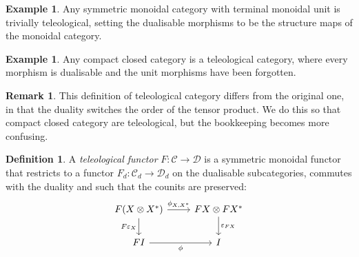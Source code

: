 \documentclass[11pt,letterpaper]{article}
\theoremstyle{plain}
\theoremstyle{definition}
\newtheorem{definition}[theorem]{Definition}
\newtheorem{example}[theorem]{Example}
\newtheorem{remark}[theorem]{Remark}
\newcommand{\C}{\mathscr{C}}
\newcommand{\D}{\mathscr{D}}
\newcommand{\todo}[1]{\textcolor{red}{\small #1}}
\begin{document}
\begin{example}
  Any symmetric monoidal category with terminal monoidal unit is trivially teleological, setting the dualisable morphisms to be the structure maps of the monoidal category.
\end{example}

\begin{example}
  Any compact closed category is a teleological category, where every morphism is dualisable and the unit morphisms have been forgotten.
\end{example}

\begin{remark}
This definition of teleological category differs from the original one, in that the duality switches the order of the tensor product. We do this so that compact closed category are teleological, but the bookkeeping becomes more confusing.
\end{remark}



\begin{definition}
  A \emph{teleological functor} $F : \C \to \D$ is a symmetric monoidal functor that restricts to a functor $F_d : \C_d \to \D_d$ on the dualisable subcategories, commutes with the duality and such that the counits are preserved:
  \[
   \begin{tikzcd}
    F(X \otimes X^*) \ar[r, "\phi_{X, X^*}"]  \ar[d, "F\varepsilon_X", swap] & FX \otimes FX^* \ar[d, "\varepsilon_{FX}"] \\
    FI \ar[r, "\phi", swap] & I
  \end{tikzcd}
  \]
\end{definition}

\end{document}
